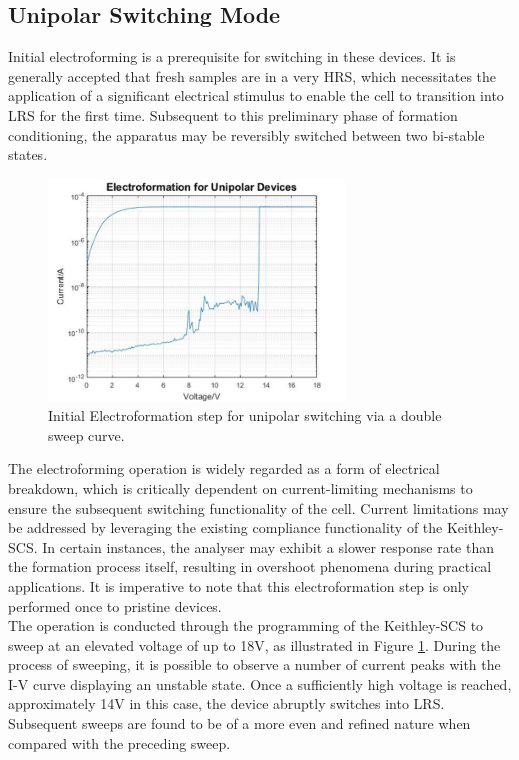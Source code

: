 \subsection[Unipolar Switching Mode]{Unipolar Switching Mode}

\noindent Initial electroforming is a prerequisite for switching in these devices. It is generally accepted that fresh samples are in a very HRS, which necessitates the application of a significant electrical stimulus to enable the cell to transition into LRS for the first time. Subsequent to this preliminary phase of formation conditioning, the apparatus may be reversibly switched between two bi-stable states. \\

\begin{figure}[htbp!] 
    \centering    
    \includegraphics[width=0.7\textwidth]{Chapter3/Figs/g.png}
    \caption[Initial Electroformation step for unipolar switching.]{Initial Electroformation step for unipolar switching via a double sweep curve.}
    \label{fig:3g}
\end{figure}

\noindent The electroforming operation is widely regarded as a form of electrical breakdown, which is critically dependent on current-limiting mechanisms to ensure the subsequent switching functionality of the cell. Current limitations may be addressed by leveraging the existing compliance functionality of the Keithley-SCS. In certain instances, the analyser may exhibit a slower response rate than the formation process itself, resulting in overshoot phenomena during practical applications. It is imperative to note that this electroformation step is only performed once to pristine devices. \\

\noindent The operation is conducted through the programming of the Keithley-SCS to sweep at an elevated voltage of up to 18V, as illustrated in Figure \ref{fig:3g}. During the process of sweeping, it is possible to observe a number of current peaks with the I-V curve displaying an unstable state. Once a sufficiently high voltage is reached, approximately 14V in this case, the device abruptly switches into LRS. Subsequent sweeps are found to be of a more even and refined nature when compared with the preceding sweep. \\

